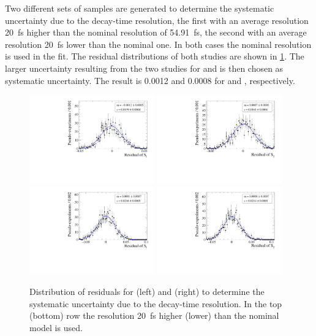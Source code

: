 Two different sets of samples are generated to determine the systematic uncertainty due to the decay-time resolution, the first with an average resolution \SI{20}{\femto\second} higher than the nominal resolution of \SI{54.91}{\femto\second}, the second with an average resolution \SI{20}{\femto\second} lower than the nominal one.
In both cases the nominal resolution is used in the fit.
The residual distributions of both studies are shown in \cref{fig:systUncertRes}.
The larger uncertainty resulting from the two studies for \Sf and \Sfbar is then chosen as systematic uncertainty.
The result is \num{0.0012} and \num{0.0008} for \Sf and \Sfbar, respectively.
\begin{figure}[tbp]
    \centering
    \includegraphics[width=0.48\textwidth]{10Systematics/figs/ResHigh_Sf_res.pdf}
    \includegraphics[width=0.48\textwidth]{10Systematics/figs/ResHigh_Sfbar_res.pdf}\\
    \includegraphics[width=0.48\textwidth]{10Systematics/figs/ResLow_Sf_res.pdf}
    \includegraphics[width=0.48\textwidth]{10Systematics/figs/ResLow_Sfbar_res.pdf}
    \caption{Distribution of residuals for \Sf (left) and \Sfbar (right) to determine the systematic uncertainty due to the decay-time resolution.
    In the top  (bottom) row the resolution \SI{20}{\femto\second} higher (lower) than the nominal model is used.}
    \label{fig:systUncertRes}
\end{figure}


